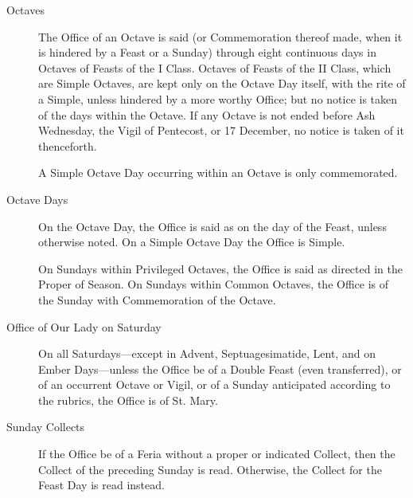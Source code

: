 \begin{description}
\item[Octaves] The Office of an Octave is said (or Commemoration thereof made, when it is hindered by a Feast or a Sunday) through eight continuous days in Octaves of Feasts of the I Class. Octaves of Feasts of the II Class, which are Simple Octaves, are kept only on the Octave Day itself, with the rite of a Simple, unless hindered by a more worthy Office; but no notice is taken of the days within the Octave. If any Octave is not ended before Ash Wednesday, the Vigil of Pentecost, or 17 December, no notice is taken of it thenceforth.\par
A Simple Octave Day occurring within an Octave is only commemorated.


\item[Octave Days] On the Octave Day, the Office is said as on the day of the Feast, unless otherwise noted. On a Simple Octave Day the Office is Simple.
\par
On Sundays within Privileged Octaves, the Office is said as directed in the Proper of Season. On Sundays within Common Octaves, the Office is of the Sunday with Commemoration of the Octave.

\item[Office of Our Lady on Saturday] On all Saturdays---except in Advent, Septuagesimatide, Lent, and on Ember Days---unless the Office be of a Double Feast (even transferred), or of an occurrent Octave or Vigil, or of a Sunday anticipated according to the rubrics, the Office is of St. Mary.

\item[Sunday Collects] If the Office be of a Feria without a proper or indicated Collect, then the Collect of the preceding Sunday is read. Otherwise, the Collect for the Feast Day is read instead.


\end{description}


